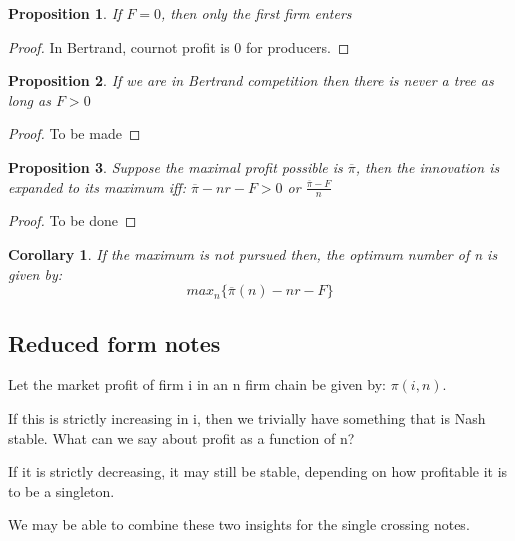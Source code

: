 \documentclass{article}
\newtheorem{corollary}{Corollary}
\newtheorem{proposition}{Proposition}
\begin{document}
\begin{proposition}
If $F=0$, then only the first firm enters
\end{proposition}

\begin{proof}
In Bertrand, cournot profit is 0 for producers. 
\end{proof}

\begin{proposition}
If we are in Bertrand competition then there is never a tree as long as $F>0$
\end{proposition}

\begin{proof}
To be made
\end{proof}



\begin{proposition}
Suppose the maximal profit possible is $\overline{\pi}$, then the innovation is expanded to its maximum iff: $\overline{\pi}-n r-F>0$ or $\frac{\overline{\pi}-F}{n}$
\end{proposition}

\begin{proof}
To be done
\end{proof}


\begin{corollary}
If the maximum is not pursued then, the optimum number of n is given by:
\begin{equation*}
max_n\{\overline{\pi}(n)-n r-F  \}
\end{equation*}
\end{corollary}

\subsection{Reduced form notes}

Let the market profit of firm i in an n firm chain be given by: $\pi(i,n)$. 

If this is strictly increasing in i, then we trivially have something that is Nash stable. What can we say about profit as a function of n? 

If it is strictly decreasing, it may still be stable, depending on how profitable it is to be a singleton. 

We may be able to combine these two insights for the single crossing notes. 
\end{document}
